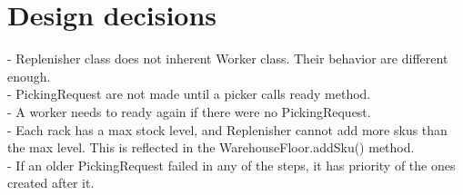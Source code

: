 \documentclass[12pt]{article}
\begin{document}
\section*{Design decisions}
- Replenisher class does not inherent Worker class. Their behavior are different enough.\\
- PickingRequest are not made until a picker calls ready method.\\
- A worker needs to ready again if there were no PickingRequest.\\
- Each rack has a max stock level, and Replenisher cannot add more skus than the max level. This is reflected in the WarehouseFloor.addSku() method.\\
- If an older PickingRequest failed in any of the steps, it has priority of the ones created after it.
\end{document}
